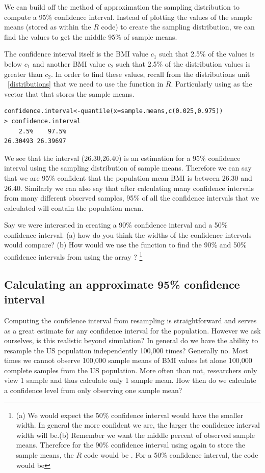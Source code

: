 We can build off the method of approximation the sampling distribution to compute a 95\% confidence interval. Instead of plotting the values of the sample means (stored as  within the $R$ code) to create the sampling distribution, we can find the values to get the middle 95\% of sample means.  

The confidence interval itself is the BMI value  $c_1$ such that 2.5\% of the  values is below $c_1$ and another BMI value $c_2$ such that 2.5\% of the distribution values is greater than $c_2$. In order to find these values, recall from the distributions unit ~\ref{distributions} that we need to use the  function in $R$. Particularly using  as the vector that that stores the sample means. 
\begin{verbatim}
confidence.interval<-quantile(x=sample.means,c(0.025,0.975))
> confidence.interval
    2.5%    97.5% 
26.30493 26.39697 
\end{verbatim}
We see that the interval (26.30,26.40) is an estimation for a 95\% confidence interval using the sampling distribution of sample means. Therefore we can say that we are 95\% confident that the population mean BMI is between 26.30 and 26.40. Similarly we can also say that after calculating many confidence intervals from many different observed samples, 95\% of all the confidence intervals that we calculated will contain the population mean. 

\begin{exercise}
Say we were interested in creating a 90\% confidence interval and a 50\% confidence interval. (a) how do you think the widths of the confidence intervals would compare? (b) How would we use the  function to find the 90\% and 50\% confidence intervals from using the array ?
 \footnote{(a) We would expect the 50\% confidence interval would have the smaller width. In general the more confident we are, the larger the confidence interval width will be.(b) Remember we want the middle percent of observed sample means. Therefore for the 90\% confidence interval using  again to store the sample means, the $R$ code would be . For a 50\% confidence interval, the code would be }
\end{exercise}

\subsection{Calculating an approximate 95\% confidence interval}
Computing the confidence interval from resampling is straightforward and serves as a great estimate for any confidence interval for the population. However we ask ourselves, is this realistic beyond simulation? In general do we have the ability to resample the US population independently 100,000 times? Generally no. Most times we cannot observe 100,000 sample means of BMI values let alone 100,000 complete samples from the US population. More often than not, researchers only view 1 sample and thus calculate only 1 sample mean. How then do we calculate a confidence level from only observing one sample mean? 

